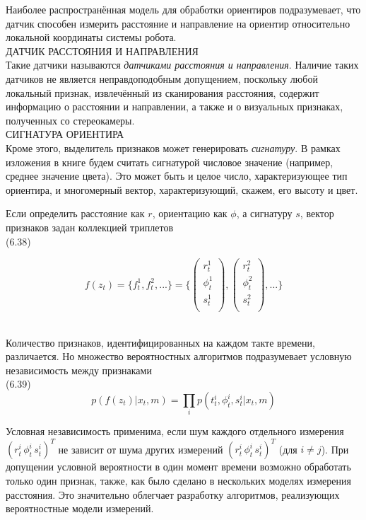 \documentclass[10pt,a4paper]{article}
\begin{document}
Наиболее распространённая модель для обработки ориентиров подразумевает, что датчик способен измерить расстояние и направление на ориентир относительно локальной координаты системы робота.\\ 
ДАТЧИК РАССТОЯНИЯ И НАПРАВЛЕНИЯ\\
Такие датчики называются \textit{датчиками расстояния и направления}. Наличие таких датчиков не является неправдоподобным допущением, поскольку любой локальный признак, извлечённый из сканирования расстояния, содержит информацию о расстоянии и направлении, а также и о визуальных признаках, полученных со стереокамеры.\\
СИГНАТУРА ОРИЕНТИРА\\ Кроме этого, выделитель признаков может генерировать \textit{сигнатуру}. В  рамках изложения в книге будем считать сигнатурой числовое значение (например, среднее значение цвета). Это может быть и целое число, характеризующее тип ориентира, и многомерный вектор, характеризующий, скажем, его высоту и цвет.

Если определить расстояние как $r$, ориентацию как $\phi$, а сигнатуру $s$, вектор признаков задан коллекцией триплетов\\

(6.38)
\begin{minipage}{0.2\textwidth}
	\begin{equation*}
	f(z_t)=\{f_t^1,f_t^2,...\}=\{	\left(\begin{array}{c}
	r_t^1\\
	\phi_t^1\\
	s_t^1\\
	\end{array}\right)
	,
	\left(\begin{array}{c}
	r_t^2\\
	\phi_t^2\\
	s_t^2\\
	\end{array}\right)
	,...\}
	\end{equation*}
\end{minipage}\\

Количество признаков, идентифицированных на каждом такте времени, различается. Но множество вероятностных алгоритмов подразумевает условную независимость между признаками \\

(6.39)
$$p(f(z_t)|x_t,m)=\prod_i p(t_t^i,\phi_t^i,s_t^i|x_t,m)$$

Условная независимость применима, если шум каждого отдельного измерения $(r_t^i\, \phi^i_t\, s^i_t)^T$ не зависит от шума других измерений $(r_t^i\, \phi^i_t\, s^i_t)^T$ (для $i \neq j$). При допущении условной вероятности в один момент времени возможно обработать только один признак, также, как было сделано в нескольких моделях измерения расстояния. Это значительно облегчает разработку алгоритмов, реализующих вероятностные модели измерений. 
\end{document}
